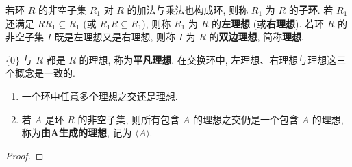 \documentclass[../../main.tex]{subfiles}
\begin{document}
\begin{definition}
若环 \( R \) 的非空子集 \( R_1 \) 对 \( R \) 的加法与乘法也构成环, 则称 \( R_1 \) 为 \( R \) 的\textbf{子环}. 若 \( R_1 \) 还满足 \( RR_1 \subseteq R_1 \) (或 \( R_1R \subseteq R_1 \)), 则称 \( R_1 \) 为 \( R \) 的\textbf{左理想} (或\textbf{右理想}). 若环 \( R \) 的非空子集 \( I \) 既是左理想又是右理想, 则称 \( I \) 为 \( R \) 的\textbf{双边理想}, 简称\textbf{理想}.
\end{definition}
\begin{remark}
\( \{0\} \) 与 \( R \) 都是 \( R \) 的理想, 称为\textbf{平凡理想}. 在交换环中, 左理想、右理想与理想这三个概念是一致的.
\end{remark}

\begin{theorem}
\begin{enumerate}
\item 一个环中任意多个理想之交还是理想.

\item 若 \( A \) 是环 \( R \) 的非空子集, 则所有包含 \( A \) 的理想之交仍是一个包含 \( A \) 的理想, 称为\textbf{由\(\boldsymbol{A}\)生成的理想}, 记为 \( \langle A \rangle \).
\end{enumerate}
\end{theorem}
\begin{proof}


\end{proof}
\end{document}
